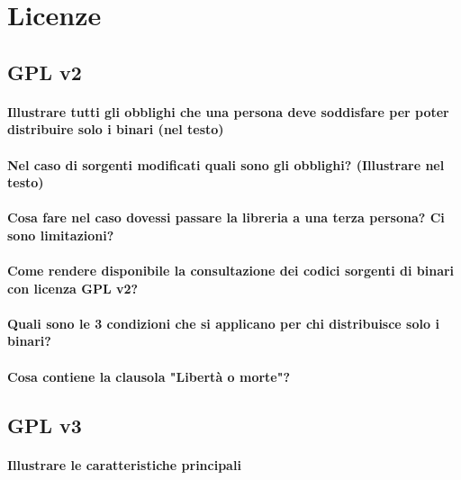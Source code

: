 \documentclass[a4paper]{article}
\begin{document}
		
		
		
	\section{Licenze}
	
		\subsection{GPL v2}
		
			\paragraph{Illustrare tutti gli obblighi che una persona deve soddisfare per poter distribuire solo i binari 	(nel testo)}
		
			\paragraph{Nel caso di sorgenti modificati quali sono gli obblighi? (Illustrare nel testo)}
		
			\paragraph{Cosa fare nel caso dovessi passare la libreria a una terza persona? Ci sono limitazioni?}
			
			\paragraph{Come rendere disponibile la consultazione dei codici sorgenti di binari con licenza GPL v2?} %
			
			\paragraph{Quali sono le 3 condizioni che si applicano per chi distribuisce solo i binari?}
			
			\paragraph{Cosa contiene la clausola "Libertà o morte"?}
		
		\subsection{GPL v3}
			
			\paragraph{Illustrare le caratteristiche principali}
		
\end{document}
